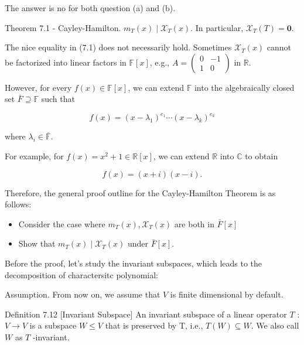 \documentclass[11pt]{article}
\begin{document}
The answer is no for both question (a) and (b).

Theorem 7.1 - Cayley-Hamilton. \({m}_{T}\left( x\right)  \mid  {\mathcal{X}}_{T}\left( x\right)\). In particular, \({\mathcal{X}}_{T}\left( T\right)  = \mathbf{0}\).

The nice equality in (7.1) does not necessarily hold. Sometimes \({\mathcal{X}}_{T}\left( x\right)\) cannot be factorized into linear factors in \(\mathbb{F}\left\lbrack  x\right\rbrack\), e.g., \(A = \left( \begin{matrix} 0 &  - 1 \\  1 & 0 \end{matrix}\right)\) in \(\mathbb{R}\).

However, for every \(f\left( x\right)  \in  \mathbb{F}\left\lbrack  x\right\rbrack\), we can extend \(\mathbb{F}\) into the algebraically closed set \(\bar{F} \supseteq  \mathbb{F}\) such that

\[
f\left( x\right)  = {\left( x - {\lambda }_1\right) }^{{e}_1}\cdots {\left( x - {\lambda }_{k}\right) }^{{e}_{k}}
\]

where \({\lambda }_{i} \in  \overline{\mathbb{F}}\).

For example, for \(f\left( x\right)  = {x}^2 + 1 \in  \mathbb{R}\left\lbrack  x\right\rbrack\), we can extend \(\mathbb{R}\) into \(\mathbb{C}\) to obtain

\[
f\left( x\right)  = \left( {x + i}\right) \left( {x - i}\right) .
\]

Therefore, the general proof outline for the Cayley-Hamilton Theorem is as follows:

\begin{itemize}
\item Consider the case where \({m}_{T}\left( x\right) ,{\mathcal{X}}_{T}\left( x\right)\) are both in \(\bar{F}\left\lbrack  x\right\rbrack\)
\end{itemize}

\begin{itemize}
\item Show that \({m}_{T}\left( x\right)  \mid  {\mathcal{X}}_{T}\left( x\right)\) under \(\bar{F}\left\lbrack  x\right\rbrack\).
\end{itemize}

Before the proof, let's study the invariant subspaces, which leads to the decomposition of charactersitc polynomial:

Assumption. From now on, we assume that \(V\) is finite dimensional by default.

Definition 7.12 [Invariant Subspace] An invariant subspace of a linear operator \(T\) : \(V \rightarrow  V\) is a subspace \(W \leq  V\) that is preserved by T, i.e., \(T\left( W\right)  \subseteq  W\). We also call \(W\) as \(T\) -invariant.
\end{document}
